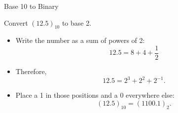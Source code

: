 \documentclass[10pt]{beamer}
\begin{document}
\begin{frame}{Base 10 to Binary}
\begin{example}
Convert $(12.5)_{10}$ to base 2.
\end{example}

\begin{itemize}
    \item Write the number as a sum of powers of 2:
    \[
    12.5 = 8+4+\frac12
    \]

    \item Therefore,
    \[
    12.5=2^3+2^2+2^{-1}.
    \]

    \item Place a 1 in those positions and a 0 everywhere else:
    \[
    (12.5)_{10}=(1100.1)_2.
    \]
\end{itemize}
\end{frame}
\end{document}
